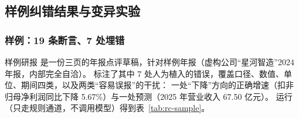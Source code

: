 \subsection{样例纠错结果与变异实验}
\label{sec:rc-results}

\subsubsection{样例：19 条断言、7 处埋错}

样例研报  是一份三页的年报点评草稿，针对样例年报（虚构公司“星河智造”2024 年报，内部完全自洽）。
 标注了其中 7 处人为植入的错误，覆盖口径、数值、单位、期间四类，以及两类“容易误报”的干扰：
一处“下降”方向的正确增速（扣非归母净利润同比下降 5.67\%）与一处预测（2025 年营业收入 67.50 亿元）。
运行 （只走规则通道，不调用模型）得到表~\ref{tab:rc-sample}。

